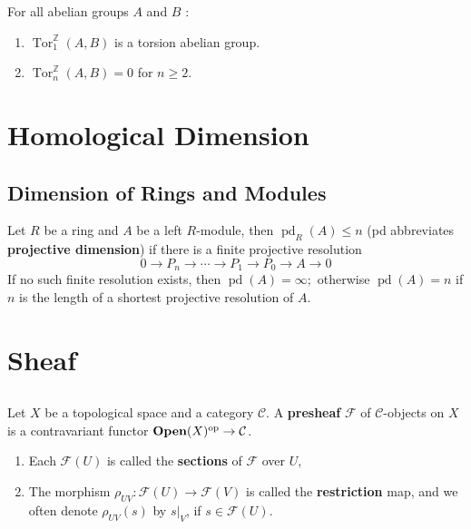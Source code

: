 \documentclass[12pt, oneside]{book}
\begin{document}
\begin{proposition}
    For all abelian groups $A$ and $B$ :
    \begin{enumerate}
        \item
              $\operatorname{Tor}_1^{\mathbb{Z}}(A, B)$ is a torsion abelian group.
        \item
              $\operatorname{Tor}_n^{\mathbb{Z}}(A, B)=0$ for $n \geq 2$.
    \end{enumerate}
\end{proposition}






\chapter{Homological Dimension}
\section{Dimension of Rings and Modules}


\begin{definition}
    Let $R$ be a ring and $A$ be a left $R$-module, then $\operatorname{pd}_R(A) \leq n$ (pd abbreviates \textbf{projective dimension}) if there is a finite projective resolution
    \begin{equation*}
        0 \rightarrow P_n \rightarrow \cdots \rightarrow P_1 \rightarrow P_0 \rightarrow A \rightarrow 0
    \end{equation*}
    If no such finite resolution exists, then $\operatorname{pd}(A)=\infty ;$ otherwise $\operatorname{pd}(A)=n$ if $n$ is the length of a shortest projective resolution of $A$.
\end{definition}






\chapter{Sheaf}
\section{}
\begin{definition}
    Let $X$ be a topological space and a category $\mathcal{C}$.
    A \textbf{presheaf} $\mathscr{F}$ of $\mathcal{C}$-objects on $X$ is a contravariant functor $\mathbf{Open}(X)^{\mathrm{op}} \rightarrow \mathcal{C}$.

    \begin{enumerate}
        \item
              Each $\mathscr{F}(U)$ is called the \textbf{sections} of $\mathscr{F}$ over $U$,
        \item
              The morphism $\rho_{U V}: \mathscr{F}(U) \rightarrow \mathscr{F}(V)$ is called the \textbf{restriction} map, and we often denote $\rho_{U V}(s)$ by $s|_{V}$, if $s\in \mathscr{F}(U)$.
    \end{enumerate}
\end{definition}
\end{document}
